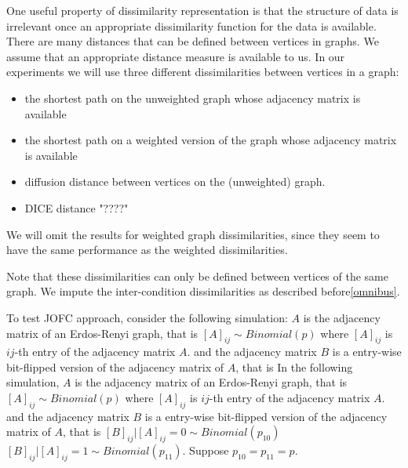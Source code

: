 \documentclass[11pt]{article} %
\begin{document}
One useful property of dissimilarity representation is that the structure of data is irrelevant once an appropriate dissimilarity function  for the data is available. 
There are many distances that can be defined between vertices in graphs. We assume that an appropriate distance measure is available to us.
In our experiments we will use three different dissimilarities between vertices in a graph:
\begin{itemize}
 \item the shortest path on the  unweighted graph whose adjacency matrix is available
 \item the shortest path on a weighted version of the graph whose adjacency matrix is available
 \item diffusion distance between vertices on the (unweighted) graph.
 \item DICE distance \cite{DICE,weightedDICE,} "????"
 \end{itemize}
 We will omit the results for weighted graph dissimilarities, since they seem to have the same performance as the weighted dissimilarities.
 
 Note that these dissimilarities can only be defined between vertices of the same graph. We impute the inter-condition dissimilarities   as described before\ref{omnibus}.
 
  To test JOFC approach, consider the following simulation: $A$ is the adjacency matrix of an Erdos-Renyi graph, that is
  $\left[A\right]_{ij} \sim Binomial(p)$ where $\left[A\right]_{ij}$ is $ij$-th entry of the adjacency matrix  $A$.
   and the adjacency matrix  $B$ is a entry-wise bit-flipped version of the adjacency matrix of $A$, that is
   In the following simulation, $A$ is the adjacency matrix of an Erdos-Renyi graph, that is
  $\left[A\right]_{ij} \sim Binomial(p)$ where $\left[A\right]_{ij}$ is $ij$-th entry of the adjacency matrix  $A$.
   and the adjacency matrix  $B$ is a entry-wise bit-flipped version of the adjacency matrix of $A$, that is
   $\left[B\right]_{ij}|\left[A\right]_{ij}=0 \sim Binomial(p_{10})$ $\left[B\right]_{ij}|\left[A\right]_{ij}=1 \sim Binomial(p_{11})$. Suppose $p_{10}=p_{11}=p$.
  
\end{document}

